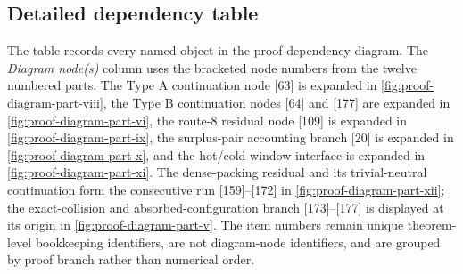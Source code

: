 \documentclass[11pt]{article}
\begin{document}
\clearpage

\subsection*{Detailed dependency table}

The table records every named object in the proof-dependency diagram.  The \emph{Diagram node(s)} column uses the bracketed node numbers from the twelve numbered parts.  The Type A continuation node [63] is expanded in \cref{fig:proof-diagram-part-viii}, the Type B continuation nodes [64] and [177] are expanded in \cref{fig:proof-diagram-part-vi}, the route-8 residual node [109] is expanded in \cref{fig:proof-diagram-part-ix}, the surplus-pair accounting branch [20] is expanded in \cref{fig:proof-diagram-part-x}, and the hot/cold window interface is expanded in \cref{fig:proof-diagram-part-xi}.  The dense-packing residual and its trivial-neutral continuation form the consecutive run [159]--[172] in \cref{fig:proof-diagram-part-xii}; the exact-collision and absorbed-configuration branch [173]--[177] is displayed at its origin in \cref{fig:proof-diagram-part-v}.  The item numbers remain unique theorem-level bookkeeping identifiers, are not diagram-node identifiers, and are grouped by proof branch rather than numerical order.
\end{document}
